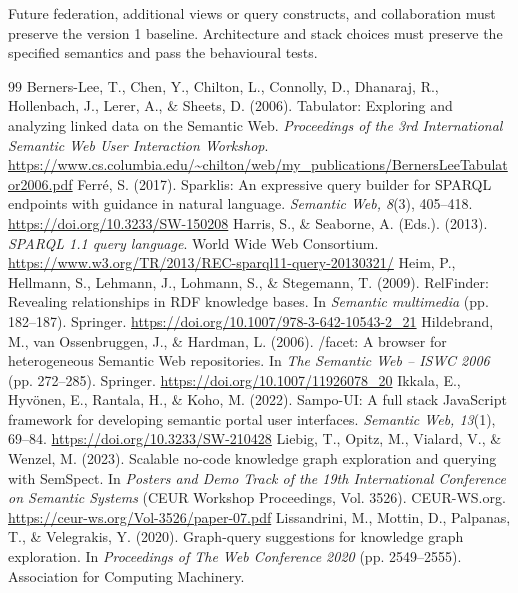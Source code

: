 \documentclass[11pt,a4paper]{article}
\begin{document}
Future federation, additional views or query constructs, and collaboration must preserve the version 1 baseline. Architecture and stack choices must preserve the specified semantics and pass the behavioural tests.

\begin{thebibliography}{99}
\setlength{\itemsep}{5pt}
Berners-Lee, T., Chen, Y., Chilton, L., Connolly, D., Dhanaraj, R., Hollenbach, J., Lerer, A., \& Sheets, D. (2006).
Tabulator: Exploring and analyzing linked data on the Semantic Web.
\emph{Proceedings of the 3rd International Semantic Web User Interaction Workshop}.
\url{https://www.cs.columbia.edu/~chilton/web/my_publications/BernersLeeTabulator2006.pdf}
Ferr\'e, S. (2017). Sparklis: An expressive query builder for SPARQL endpoints with guidance in natural language.
\emph{Semantic Web, 8}(3), 405--418. \url{https://doi.org/10.3233/SW-150208}
Harris, S., \& Seaborne, A. (Eds.). (2013). \emph{SPARQL 1.1 query language}. World Wide Web Consortium.
\url{https://www.w3.org/TR/2013/REC-sparql11-query-20130321/}
Heim, P., Hellmann, S., Lehmann, J., Lohmann, S., \& Stegemann, T. (2009).
RelFinder: Revealing relationships in RDF knowledge bases. In \emph{Semantic multimedia} (pp. 182--187). Springer.
\url{https://doi.org/10.1007/978-3-642-10543-2_21}
Hildebrand, M., van Ossenbruggen, J., \& Hardman, L. (2006).
/facet: A browser for heterogeneous Semantic Web repositories. In \emph{The Semantic Web -- ISWC 2006} (pp. 272--285). Springer.
\url{https://doi.org/10.1007/11926078_20}
Ikkala, E., Hyv\"onen, E., Rantala, H., \& Koho, M. (2022).
Sampo-UI: A full stack JavaScript framework for developing semantic portal user interfaces.
\emph{Semantic Web, 13}(1), 69--84. \url{https://doi.org/10.3233/SW-210428}
Liebig, T., Opitz, M., Vialard, V., \& Wenzel, M. (2023).
Scalable no-code knowledge graph exploration and querying with SemSpect.
In \emph{Posters and Demo Track of the 19th International Conference on Semantic Systems} (CEUR Workshop Proceedings, Vol. 3526). CEUR-WS.org.
\url{https://ceur-ws.org/Vol-3526/paper-07.pdf}
Lissandrini, M., Mottin, D., Palpanas, T., \& Velegrakis, Y. (2020).
Graph-query suggestions for knowledge graph exploration.
In \emph{Proceedings of The Web Conference 2020} (pp. 2549--2555). Association for Computing Machinery.

\end{thebibliography}
\end{document}
